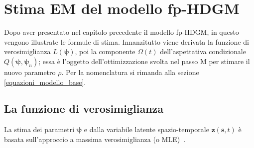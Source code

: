 \chapter[Stima EM del modello fp-HDGM]{Stima EM del modello fp-HDGM}

Dopo aver presentato nel capitolo precedente il modello fp-HDGM, in questo vengono illustrate le formule di stima. Innanzitutto viene derivata la funzione di verosimiglianza $L(\boldsymbol{\psi})$, poi la componente $\Omega(t)$ dell'aspettativa condizionale $Q(\boldsymbol{\psi}, \boldsymbol{\psi}_n)$; essa è l'oggetto dell'ottimizzazione svolta nel passo M per stimare il nuovo parametro $\rho$. Per la nomenclatura si rimanda alla sezione \ref{equazioni_modello_base}.

\section[La funzione di verosimiglianza]{La funzione di verosimiglianza}
La stima dei parametri $\boldsymbol{\psi}$ e dalla variabile latente spazio-temporale $\mathbf{z}(\mathbf{s}, t)$ è basata sull'approccio a massima verosimiglianza (o MLE)~\cite{paper_f_HDGM}.

